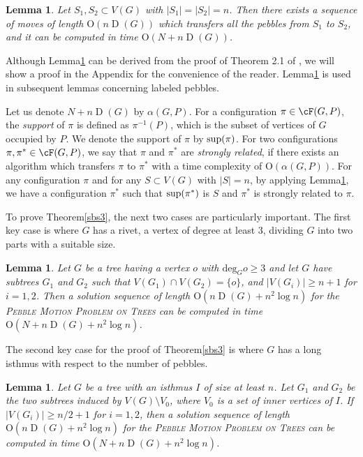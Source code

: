 \documentclass[letter,11pt]{article}
\newtheorem{la}[thm]{Lemma}
\theoremstyle{definition}
\theoremstyle{definition}
\DeclareMathOperator{\D}{D}
\newcommand{\1}{\boldmath$~1~$\unboldmath}
\newcommand{\Ord}{\mathrm{O}}
\newcommand{\tume}{\hspace*{0.2em}}
\def\deg{\textrm{deg}}
\begin{document}
\begin{la}\label{sbs0}
Let $S_1, S_2 \subset V(G)$ with $|S_1| = |S_2| = n$.
Then there exists a sequence of moves of length $\Ord (n\D(G))$ which transfers all the pebbles from $S_1$ to $S_2$, and it can be computed in time $\Ord (N + n\D(G))$.
\end{la}

Although Lemma\tume\ref{sbs0} can be derived from the proof of Theorem 2.1 of  \cite{WOS:000254460900008}, we will show a proof in the Appendix for the convenience of the reader.
Lemma\tume\ref{sbs0} is used in subsequent lemmas concerning labeled pebbles.


Let us denote $N + n\D(G)$ by $\alpha(G, P)$.
For a configuration $\pi \in \cF(G,P)$, the {\it support} of $\pi$ is defined as $\pi^{-1}(P)$, which is the subset of vertices of $G$ occupied by $P$.
We denote the support of $\pi$ by ${\rm sup}(\pi)$.   
For two configurations $\pi, \pi^{\ast} \in \cF(G,P)$, we say that $\pi$ and $\pi^{\ast}$ are {\it strongly related}, if there exists an algorithm which transfers $\pi$ to $\pi^{\ast}$ with a time complexity of $\Ord (\alpha(G,P))$.
For any configuration $\pi$ and for any $S \subset V(G)$ with $|S| = n$, by applying Lemma\tume\ref{sbs0}, we have a configuration $\pi^{\ast}$ such that ${\rm sup}(\pi^{\ast})$ is $S$ and $\pi^{\ast}$ is strongly related to $\pi$. 

To prove Theorem\tume\ref{sbs3}, the next two cases are particularly important.
The first key case is where $G$ has a rivet, a vertex of degree at least $3$, dividing $G$ into two parts with a suitable size.

\begin{la}\label{sbs1}
Let $G$ be a tree having a vertex $o$ with $\deg_G o \ge 3$ and let $G$ have subtrees $G_1$ and $G_2$ such that $V(G_1) \cap V(G_2) = \{ o \}$, and $|V(G_i)| \ge n + 1$ for $i=1, 2$. 
Then a solution sequence of length $\Ord (n\D(G) + n^2 \log n)$ for the \textsc{Pebble Motion Problem on Trees} can be computed in time $\Ord (N + n\D(G) + n^2 \log n)$.
\end{la}

The second key case for the proof of Theorem\tume\ref{sbs3} is where $G$ has a long isthmus with respect to the number of pebbles.

\begin{la}\label{sbs2}
Let $G$ be a tree with an isthmus $I$ of size at least $n$.
Let $G_1$ and $G_2$ be the two subtrees induced by $V(G) \setminus V_0$, where $V_0$ is a set of inner vertices of $I$.
If $|V(G_i)| \ge n/2 + 1$ for $i = 1,2$, then a solution sequence of length $\Ord (n\D(G) + n^2 \log n)$ for the \textsc{Pebble Motion Problem on Trees} can be computed in time $\Ord (N + n\D(G) + n^2 \log n)$.
\end{la}
\end{document}
